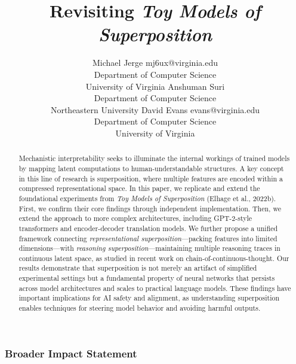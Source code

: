 \documentclass[10pt]{article} %
\title{Revisiting \emph{Toy Models of Superposition}}
\author{\name Michael Jerge \email mj6ux@virginia.edu \\
      \addr Department of Computer Science\\
      University of Virginia
      \AND
      \name Anshuman Suri \email  \\
      \addr Department of Computer Science\\
      Northeastern University
      \AND
      \name David Evans \email evans@virginia.edu\\
      \addr Department of Computer Science \\
      University of Virginia}
\theoremstyle{plain}
\theoremstyle{definition}
\theoremstyle{remark}
\begin{document}
\maketitle

\begin{abstract}
Mechanistic interpretability seeks to illuminate the internal workings of trained models by mapping latent computations to human-understandable structures. A key concept in this line of research is superposition, where multiple features are encoded within a compressed representational space. In this paper, we replicate and extend the foundational experiments from \textit{Toy Models of Superposition} (Elhage et al., 2022b). First, we confirm their core findings through independent implementation. Then, we extend the approach to more complex architectures, including GPT-2-style transformers and encoder-decoder translation models. We further propose a unified framework connecting \emph{representational superposition}---packing features into limited dimensions---with \emph{reasoning superposition}---maintaining multiple reasoning traces in continuous latent space, as studied in recent work on chain-of-continuous-thought. Our results demonstrate that superposition is not merely an artifact of simplified experimental settings but a fundamental property of neural networks that persists across model architectures and scales to practical language models. These findings have important implications for AI safety and alignment, as understanding superposition enables techniques for steering model behavior and avoiding harmful outputs.
\end{abstract}












\subsubsection*{Broader Impact Statement}

\end{document}
